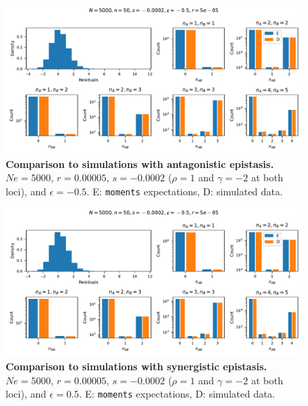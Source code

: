 \documentclass[]{article}
\begin{document}
\begin{figure}[ht!]
    \centering
    \includegraphics[width=\textwidth]{../simulations/discrete/plots/comp_Ne_5000_n_50_r_5e-05_s_0.0002_e_-0.5.pdf}
    \caption{
        \textbf{Comparison to simulations with antagonistic epistasis.}
        \(Ne=5000\), \(r=0.00005\), \(s=-0.0002\) (\(\rho=1\) and \(\gamma=-2\)
        at both loci), and \(\epsilon=-0.5\).
        E: \texttt{moments} expectations, D: simulated data.
    }
    \label{fig:validation3}
\end{figure}

\begin{figure}[ht!]
    \centering
    \includegraphics[width=\textwidth]{../simulations/discrete/plots/comp_Ne_5000_n_50_r_5e-05_s_0.0002_e_-0.5.pdf}
    \caption{
        \textbf{Comparison to simulations with synergistic epistasis.}
        \(Ne=5000\), \(r=0.00005\), \(s=-0.0002\) (\(\rho=1\) and \(\gamma=-2\)
        at both loci), and \(\epsilon=0.5\).
        E: \texttt{moments} expectations, D: simulated data.
    }
    \label{fig:validation4}
\end{figure}
\end{document}
